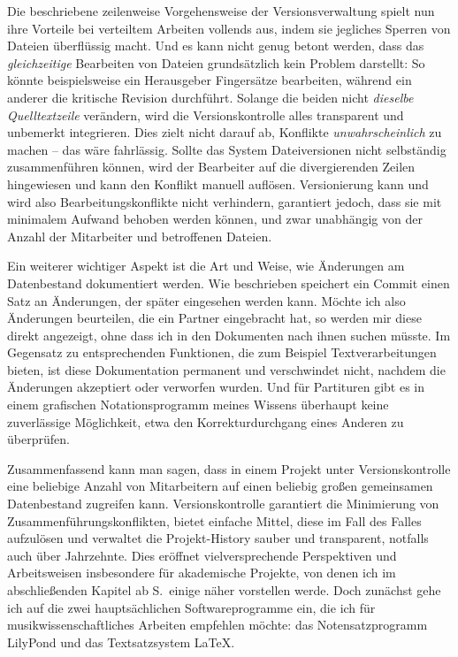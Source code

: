 \documentclass[DIV=12]{scrreprt}
\begin{document}
Die beschriebene zeilenweise Vorgehensweise der Versionsverwaltung spielt nun ihre Vorteile bei verteiltem Arbeiten vollends aus, indem sie jegliches Sperren von Dateien überflüssig macht.
Und es kann nicht genug betont werden, dass das \emph{gleichzeitige} Bearbeiten von Dateien grundsätzlich kein Problem darstellt:
So könnte beispielsweise ein Herausgeber Fingersätze bearbeiten, während ein anderer die kritische Revision durchführt.
Solange die beiden nicht \emph{dieselbe Quelltextzeile} verändern, wird die Versionskontrolle alles transparent und unbemerkt integrieren.
Dies zielt nicht darauf ab, Konflikte \emph{unwahrscheinlich} zu machen -- das wäre fahrlässig.
Sollte das System Dateiversionen nicht selbständig zusammenführen können, wird der Bearbeiter auf die divergierenden Zeilen hingewiesen und kann den Konflikt manuell auflösen.
Versionierung kann und wird also Bearbeitungskonflikte nicht verhindern, garantiert jedoch, dass sie mit minimalem Aufwand behoben werden können, und zwar unabhängig von der Anzahl der Mitarbeiter und betroffenen Dateien.

\medskip
Ein weiterer wichtiger Aspekt ist die Art und Weise, wie Änderungen am Datenbestand dokumentiert werden.
Wie beschrieben speichert ein Commit einen Satz an Änderungen, der später eingesehen werden kann.
Möchte ich also Änderungen beurteilen, die ein Partner eingebracht hat, so werden mir diese direkt angezeigt, ohne dass ich in den Dokumenten nach ihnen suchen müsste.
Im Gegensatz zu entsprechenden Funktionen, die zum Beispiel Textverarbeitungen bieten, ist diese Dokumentation permanent und verschwindet nicht, nachdem die Änderungen akzeptiert oder verworfen wurden.
Und für Partituren gibt es in einem grafischen Notationsprogramm meines Wissens überhaupt keine zuverlässige Möglichkeit, etwa den Korrekturdurchgang eines Anderen zu überprüfen.


\medskip
Zusammenfassend kann man sagen, dass in einem Projekt unter Versionskontrolle eine beliebige Anzahl von Mitarbeitern auf einen beliebig großen gemeinsamen Datenbestand zugreifen kann.
Versionskontrolle garantiert die Minimierung von Zusammenführungskonflikten, bietet einfache Mittel, diese im Fall des Falles aufzulösen und verwaltet die Projekt-History sauber und transparent, notfalls auch über Jahrzehnte.
Dies eröffnet vielversprechende Perspektiven und Arbeitsweisen insbesondere für akademische Projekte, von denen ich im abschließenden Kapitel ab S.\,\pageref{chap:pt_applications} einige näher vorstellen werde.
Doch zunächst gehe ich auf die zwei hauptsächlichen Softwareprogramme ein, die ich für musikwissenschaftliches Arbeiten empfehlen möchte:
das Notensatzprogramm LilyPond und
das Textsatzsystem \LaTeX.
\end{document}
